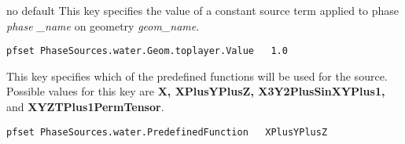 {no default}
{This key specifies the value of a constant source term applied to phase
{\em phase \_name} on geometry {\em geom\_name}.
}
\begin{display}\begin{verbatim}
pfset PhaseSources.water.Geom.toplayer.Value   1.0
\end{verbatim}\end{display}


{This key specifies which of the predefined functions will be used for the
source.
Possible values for this key are {\bf X, XPlusYPlusZ, X3Y2PlusSinXYPlus1,}
 and {\bf
XYZTPlus1PermTensor}.
}
\begin{display}\begin{verbatim}
pfset PhaseSources.water.PredefinedFunction   XPlusYPlusZ
\end{verbatim}\end{display}

